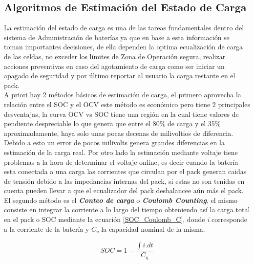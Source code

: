 \documentclass[10pt,a4paper]{article}
\begin{document}
\clearpage

\subsection{Algoritmos de Estimación del Estado de Carga}
La estimación del estado de carga es una de las tareas fundamentales dentro del sistema de Administración de baterías ya que en base a esta información se toman importantes decisiones, de ella dependen la optima ecualización de carga de las celdas, no exceder los límites de Zona de Operación segura, realizar acciones preventivas en caso del agotamiento de carga como ser iniciar un apagado de seguridad y por último reportar al usuario la carga restante en el pack.\\

A priori hay 2 métodos básicos de estimación de carga, el primero aprovecha la relación entre el SOC y el OCV este método es económico pero tiene 2 principales desventajas, la curva OCV vs SOC tiene una región en la cual tiene valores de pendiente despreciable lo que genera que entre el 80\% de carga y el 35\% aproximadamente, haya solo unas pocas decenas de milivoltios de diferencia. Debido a esto un error de pocos milivolts genera grandes diferencias en la estimación de la carga real. Por otro lado la estimación mediante voltaje tiene problemas a la hora de determinar el voltaje online, es decir cuando la batería esta conectada a una carga las corrientes que circulan por el pack generan caidas de tensión debido a las impedancias internas del pack, si estas no son tenidas en cuenta pueden llevar a que el ecualizador del pack desbalancee aún más el pack.\\

El segundo método es el \textbf{\emph{Conteo de carga}} o \textbf{\emph{Coulomb Counting}}, el mismo consiste en integrar la corriente a lo largo del tiempo obteniendo así la carga total en el pack o SOC mediante la ecuación \ref{SOC_Coulomb_C}, donde \emph{i} corresponde a la corriente de la batería y $C_\eta$ la capacidad nominal de la misma.\\

\begin{figure}[h!]
	\begin{center}
		\begin{equation}
			SOC=1-\frac{\int{i.dt}}{C_\eta}\label{SOC_Coulomb_C}
		\end{equation}	
	\end{center}
\end{figure}
\end{document}

